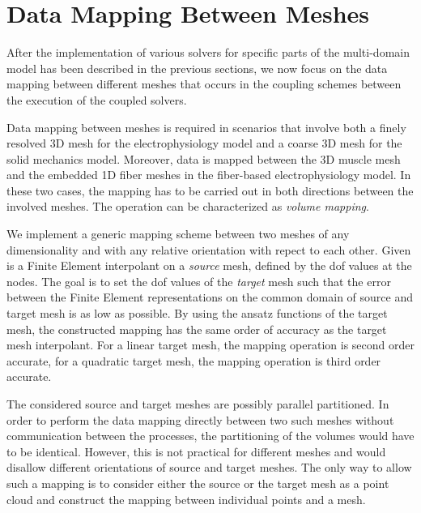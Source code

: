 
\section{Data Mapping Between Meshes}\label{sec:data_mapping_between_meshes}


After the implementation of various solvers for specific parts of the multi-domain model has been described in the previous sections, we now focus on the data mapping between different meshes that occurs in the coupling schemes between the execution of the coupled solvers. 

Data mapping between meshes is required in scenarios that involve both a finely resolved 3D mesh for the electrophysiology model and a coarse 3D mesh for the solid mechanics model. Moreover, data is mapped between the 3D muscle mesh and the embedded 1D fiber meshes in the fiber-based electrophysiology model. In these two cases, the mapping has to be carried out in both directions between the involved meshes. The operation can be characterized as \emph{volume mapping}.

We implement a generic mapping scheme between two meshes of any dimensionality and with any relative orientation with repect to each other. 
Given is a Finite Element interpolant on a \emph{source} mesh, defined by the dof values at the nodes. The goal is to set the dof values of the \emph{target} mesh such that the error between the Finite Element representations on the common domain of source and target mesh is as low as possible. By using the ansatz functions of the target mesh, the constructed mapping has the same order of accuracy as the target mesh interpolant. For a linear target mesh, the mapping operation is second order accurate, for a quadratic target mesh, the mapping operation is third order accurate.

The considered source and target meshes are possibly parallel partitioned. In order to perform the data mapping directly between two such meshes without communication between the processes, the partitioning of the volumes would have to be identical. However, this is not practical for different meshes and would disallow different orientations of source and target meshes. The only way to allow such a mapping is to consider either the source or the target mesh as a point cloud and construct the mapping between individual points and a mesh.

